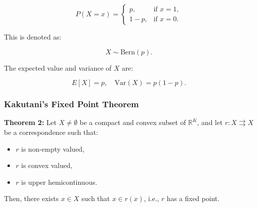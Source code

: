 \documentclass{article}
\begin{document}
\begin{itemize}
        \[
        P(X = x) =
        \begin{cases}
            p, & \text{if } x = 1, \\
            1 - p, & \text{if } x = 0.
        \end{cases}
        \]
        
        This is denoted as:
        
        \[
        X \sim \text{Bern}(p).
        \]
        
        The expected value and variance of \( X \) are:
        
        \[
        E[X] = p, \quad \text{Var}(X) = p(1 - p).
        \]
\end{itemize}

\subsubsection{Kakutani's Fixed Point Theorem}\label{kak}

\textbf{Theorem 2:} Let \( X \neq \emptyset \) be a compact and convex subset of \( \mathbb{R}^K \), and let \( r : X \rightrightarrows X \) be a correspondence such that:
\begin{itemize}
    \item \( r \) is non-empty valued,
    \item \( r \) is convex valued,
    \item \( r \) is upper hemicontinuous.
\end{itemize}
Then, there exists \( x \in X \) such that \( x \in r(x) \), i.e., \( r \) has a fixed point.
\end{document}
